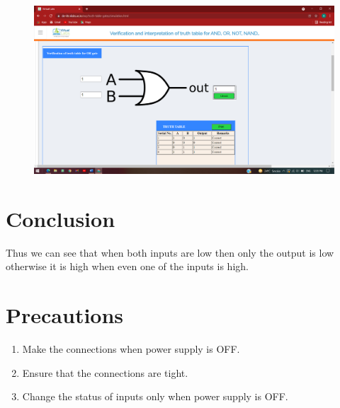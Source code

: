 		\begin{figure}[h]
		\centering
		\includegraphics[width=0.9\linewidth]{img/exp2/7}
		\caption{}
		\label{fig:2:7}
	\end{figure}

\section{Conclusion}
Thus we can see that when both inputs are low then only the output is low otherwise it is high when even one of the inputs is high.

\section{Precautions}
	\begin{enumerate}
		\tightlist
		\item Make the connections when power supply is OFF.
		\item Ensure that the connections are tight.
		\item Change the status of inputs only when power supply is OFF.
	\end{enumerate}